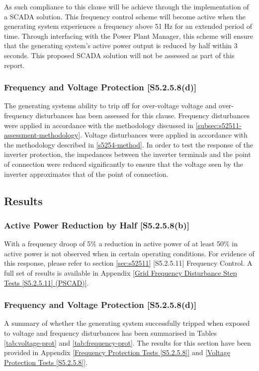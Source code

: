 \documentclass{../grid-link-report}
\begin{document}
	As such compliance to this clause will be achieve through the implementation of a SCADA solution. This frequency control scheme will become active when the generating system experiences a frequency above 51 Hz for an extended period of time. Through interfacing with the Power Plant Manager, this scheme will ensure that the generating system's active power output is reduced by half within 3 seconds. This proposed SCADA solution will not be assessed as part of this report.

	
	\subsubsection{Frequency and Voltage Protection [S5.2.5.8(d)]}
	The generating systems ability to trip off for over-voltage voltage and over-frequency disturbances has been assessed for this clause. Frequency disturbances were applied in accordance with the methodology discussed in \ref{subsec:s52511-assessment-methodology}. Voltage disturbances were applied in accordance with the methodology described in \ref{s5254-method}. In order to test the response of the inverter protection, the impedances between the inverter terminals and the point of connection were reduced significantly to ensure that the voltage seen by the inverter approximates that of the point of connection.
	
	\subsection{Results} 
	\subsubsection{Active Power Reduction by Half [S5.2.5.8(b)]}
	
	With a frequency droop of 5\% a reduction in active power of at least 50\% in active power is not observed when in certain operating conditions. For evidence of this response, please refer to section \ref{sec:s52511} [S5.2.5.11] Frequency Control. A full set of results is available in Appendix \ref{Grid Frequency Disturbance Step Tests [S5.2.5.11] (PSCAD)}.
	
	\subsubsection{Frequency and Voltage Protection [S5.2.5.8(d)]}
	A summary of whether the generating system successfully tripped when exposed to voltage and frequency disturbances has been summarised in Tables \ref{tab:voltage-prot} and \ref{tab:frequency-prot}. The results for this section have been provided in Appendix \ref{Frequency Protection Tests [S5.2.5.8]} and \ref{Voltage Protection Tests [S5.2.5.8]}.
	
\end{document}
